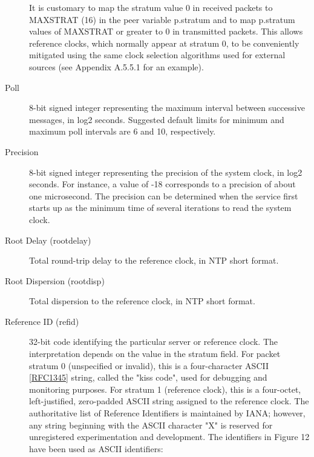 \begin{description}
It is customary to map the stratum value 0 in received packets to
MAXSTRAT (16) in the peer variable p.stratum and to map p.stratum
values of MAXSTRAT or greater to 0 in transmitted packets. This
allows reference clocks, which normally appear at stratum 0, to be
conveniently mitigated using the same clock selection algorithms used
for external sources (see Appendix A.5.5.1 for an example).

\item[Poll] 8-bit signed integer representing the maximum interval between
successive messages, in log2 seconds. Suggested default limits for
minimum and maximum poll intervals are 6 and 10, respectively.

\item[Precision] 8-bit signed integer representing the precision of the
system clock, in log2 seconds. For instance, a value of -18
corresponds to a precision of about one microsecond. The precision
can be determined when the service first starts up as the minimum
time of several iterations to read the system clock.

\item[Root Delay (rootdelay)] Total round-trip delay to the reference
clock, in NTP short format.

\item[Root Dispersion (rootdisp)] Total dispersion to the reference clock,
in NTP short format.

\item[Reference ID (refid)] 32-bit code identifying the particular server
or reference clock. The interpretation depends on the value in the
stratum field. For packet stratum 0 (unspecified or invalid), this
is a four-character ASCII \ref{RFC1345} string, called the "kiss code",
used for debugging and monitoring purposes. For stratum 1 (reference
clock), this is a four-octet, left-justified, zero-padded ASCII
string assigned to the reference clock. The authoritative list of
Reference Identifiers is maintained by IANA; however, any string
beginning with the ASCII character "X" is reserved for unregistered
experimentation and development. The identifiers in Figure 12 have
been used as ASCII identifiers:


\end{description}
